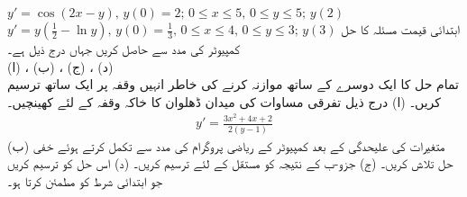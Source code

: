 $y'=\cos(2x-y),\, y(0)=2;\, 0\le x\le 5,\, 0\le y\le 5;\, y(2)$
$y'=y(\tfrac{1}{2}-\ln y),\, y(0)=\tfrac{1}{3},\, 0\le x\le 4,\, 0\le y\le 3;\, y(3)$
ابتدائی قیمت مسئلہ  کا حل کمپیوٹر کی مدد سے حاصل کریں جہاں  درج ذیل ہے۔\\
(ا) ، (ب) ، (ج) ، (د)  \\
تمام حل کا ایک دوسرے کے ساتھ موازنہ کرنے کی خاطر انہیں وقفہ  پر ایک ساتھ ترسیم کریں۔
(ا) درج ذیل تفرقی مساوات کی میدان ڈھلوان کا خاکہ وقفہ  کے لئے  کھینچیں۔
\begin{align*}
y'=\frac{3x^2+4x+2}{2(y-1)}
\end{align*}
(ب) متغیرات کی علیحدگی کے بعد کمپیوٹر کے ریاضی پروگرام کی مدد سے تکمل کرتے ہوئے خفی حل تلاش کریں۔ (ج) جزو-ب کے نتیجہ کو مستقل  کے لئے  ترسیم کریں۔ (د) اس حل کو ترسیم کریں جو ابتدائی شرط  کو مطمئن کرتا ہو۔
